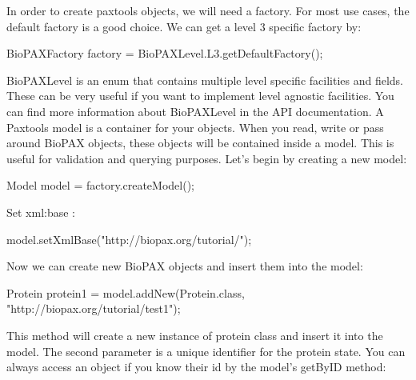 \documentclass{tufte-book}
\begin{document}
In order to create paxtools objects, we will need a factory. For most use cases, the default factory is a good choice. We can get a level 3 specific factory by:

\begin{javacode}
BioPAXFactory factory = BioPAXLevel.L3.getDefaultFactory();
\end{javacode}

BioPAXLevel is an enum that contains multiple level specific facilities and fields. These can be very useful if you want to implement level agnostic facilities. You can find more information about BioPAXLevel in the API documentation.
A Paxtools model is a container for your objects. When you read, write or pass around BioPAX objects, these objects will be contained inside a model. This is useful for validation and querying purposes. 
Let's begin by creating a new model:


\begin{javacode}
Model model = factory.createModel();
\end{javacode}

Set xml:base :

\begin{javacode}
model.setXmlBase("http://biopax.org/tutorial/");
\end{javacode}

Now we can create new BioPAX objects and insert them into the model:

\begin{javacode}
Protein protein1 = model.addNew(Protein.class, 
	"http://biopax.org/tutorial/test1"); 
\end{javacode}

This method will create a new instance of protein class and insert it into the model. The second parameter is a unique identifier for the  protein state.  You can always access an object if you know their id by the model's getByID method:
\end{document}
